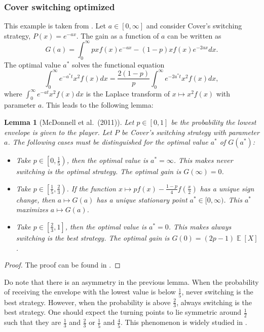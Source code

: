 \documentclass[a4paper]{report}
\theoremstyle{plain}
\newtheorem{lemma}[theorem]{Lemma}
\theoremstyle{definition}
\theoremstyle{remark}
\numberwithin{equation}{chapter}
\DeclareMathOperator{\E}{\mathbb{E}}
\DeclareMathOperator{\1}{\mathbbm{1}}
\begin{document}
\subsubsection{Cover switching optimized}
This example is taken from \cite{McDonnell11}. Let $a\in[0,\infty]$ and consider Cover's switching strategy, $P(x)=e^{-ax}$. The gain as a function of $a$ can be written as
\begin{equation}
G(a)=\int_0^\infty pxf(x)e^{-ax}-(1-p)xf(x)e^{-2ax}dx.
\end{equation}
The optimal value $a^*$ solves the functional equation
\begin{equation}
\int_0^\infty e^{-a^*t}x^2f(x)dx=\frac{2(1-p)}{p}\int_0^\infty e^{-2a^*t}x^2f(x)dx,
\end{equation}
where $\int_0^\infty e^{-at}x^2f(x)dx$ is the Laplace transform of $x\mapsto x^2f(x)$ with parameter $a$. This leads to the following lemma:
\begin{lemma}[McDonnell et al.~(2011)]
Let $p\in[0,1]$ be the probability the lowest envelope is given to the player. Let $P$ be Cover's switching strategy with parameter $a$. The following cases must be distinguished for the optimal value $a^*$ of $G(a^*)$:
\begin{itemize}
    \item[{$p\in\left[0,\frac{1}{5}\right)$:}]
    Take $p\in\left[0,\frac{1}{5}\right)$, then the optimal value is $a^*=\infty$. This makes never switching is the optimal strategy. The optimal gain is $G(\infty)=0$.
    \item[{$p\in\left[\frac{1}{5},\frac{2}{3}\right)$:}]
    Take $p\in\left[\frac{1}{5},\frac{2}{3}\right)$. If the function $x\mapsto pf(x)-\frac{1-p}{4}f\left(\frac{x}{2}\right)$ has a unique sign change, then $a\mapsto G(a)$ has a unique stationary point $a^*\in[0,\infty)$. This $a^*$ maximizes $a\mapsto G(a)$.
    \item[{$p\in\left[\frac{2}{3},1\right]$:}]
    Take $p\in\left[\frac{2}{3},1\right]$, then the optimal value is $a^*=0$. This makes always switching is the best strategy. The optimal gain is $G(0)=(2p-1)\E[X]$.
\end{itemize}
\end{lemma}
\begin{proof}
The proof can be found in \cite{McDonnell11}.
\end{proof}
Do note that there is an asymmetry in the previous lemma. When the probability of receiving the envelope with the lowest value is below $\frac{1}{5}$, never switching is the best strategy. However, when the probability is above $\frac{2}{3}$, always switching is the best strategy. One should expect the turning points to lie symmetric around $\frac{1}{2}$ such that they are $\frac{1}{3}$ and $\frac{2}{3}$ or $\frac{1}{5}$ and $\frac{4}{5}$. This phenomenon is widely studied in \cite{McDonnell11}.
\end{document}
